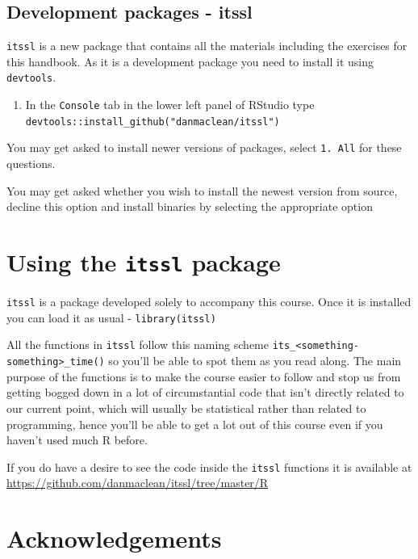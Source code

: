 \documentclass[
]{book}
\providecommand{\tightlist}{%
  \setlength{\itemsep}{0pt}\setlength{\parskip}{0pt}}
\begin{document}
\hypertarget{development-packages---itssl}{%
\subsection{Development packages - itssl}\label{development-packages---itssl}}

\texttt{itssl} is a new package that contains all the materials including the exercises for this handbook. As it is a development package you need to install it using \texttt{devtools}.

\begin{enumerate}
\def\labelenumi{\arabic{enumi}.}
\tightlist
\item
  In the \texttt{Console} tab in the lower left panel of RStudio type \texttt{devtools::install\_github("danmaclean/itssl")}
\end{enumerate}

You may get asked to install newer versions of packages, select \texttt{1.\ All} for these questions.

You may get asked whether you wish to install the newest version from source, decline this option and install binaries by selecting the appropriate option

\hypertarget{using-the-itssl-package}{%
\section{\texorpdfstring{Using the \texttt{itssl} package}{Using the itssl package}}\label{using-the-itssl-package}}

\texttt{itssl} is a package developed solely to accompany this course. Once it is installed you can load it as usual - \texttt{library(itssl)}

All the functions in \texttt{itssl} follow this naming scheme \texttt{its\_\textless{}something-something\textgreater{}\_time()} so you'll be able to spot them as you read along. The main purpose of the functions is to make the course easier to follow and stop us from getting bogged down in a lot of circumstantial code that isn't directly related to our current point, which will usually be statistical rather than related to programming, hence you'll be able to get a lot out of this course even if you haven't used much R before.

If you do have a desire to see the code inside the \texttt{itssl} functions it is available at \url{https://github.com/danmaclean/itssl/tree/master/R}

\hypertarget{acknowledgements}{%
\section{Acknowledgements}\label{acknowledgements}}
\end{document}
